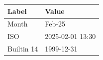 \documentclass[11pt,a4paper]{article}
\begin{document}
\begin{table}[h]
\begin{tabular}{|l|l|}
\hline
Label & Value \\ \hline
Month & Feb-25 \\ \hline
ISO & 2025-02-01 13:30 \\ \hline
Builtin 14 & 1999-12-31 \\ \hline
\end{tabular}
\end{table}
\end{document}

